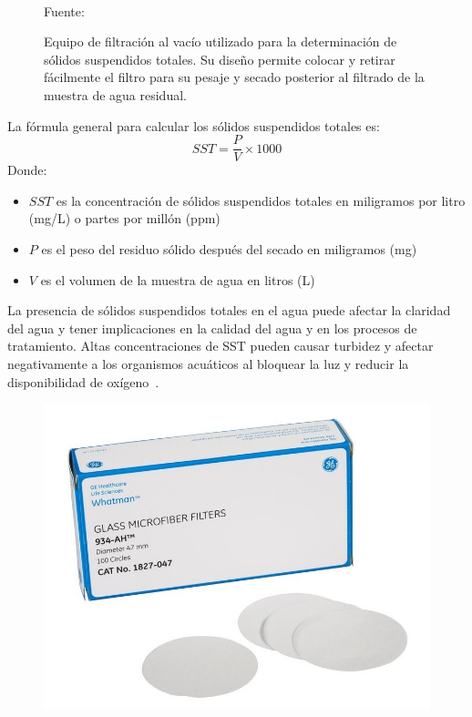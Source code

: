 \begin{enumerate}[label=\textbf{$\bullet$}]
\begin{figure}[H]
		\\\small{Fuente: \cite{Wiggens}}
		\caption{Equipo de filtración al vacío utilizado para la determinación de sólidos suspendidos totales. Su diseño permite colocar y retirar fácilmente el filtro para su pesaje y secado posterior al filtrado de la muestra de agua residual.}\label{fig:eq-filtro}
	\end{figure}
	La fórmula general para calcular los sólidos suspendidos totales es:
	\begin{equation*}
		SST = \frac{P}{V} \times 1000
	\end{equation*}
	Donde:
	\begin{itemize}
		\item $SST$ es la concentración de sólidos suspendidos totales en miligramos por litro (mg/L) o partes por millón (ppm)
		\item $P$ es el peso del residuo sólido después del secado en miligramos (mg)
		\item $V$ es el volumen de la muestra de agua en litros (L)
	\end{itemize}
	La presencia de sólidos suspendidos totales en el agua puede afectar la claridad del agua y tener implicaciones en la calidad del agua y en los procesos de tratamiento. Altas concentraciones de SST pueden causar turbidez y afectar negativamente a los organismos acuáticos al bloquear la luz y reducir la disponibilidad de oxígeno~\citep{metcalf2003}.\par
		\begin{figure}[H]
		\centering
		\includegraphics[scale=0.4]{../Images/filtro.jpg}

\end{figure}
\end{enumerate}
